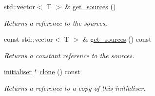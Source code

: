 \begin{DoxyCompactItemize}
std\+::vector$<$ T $>$ \& \hyperlink{classphysim_1_1init_1_1multisource_a075bc9637cb8b843253fade495de87c3}{get\+\_\+sources} ()
\begin{DoxyCompactList}\small\item\em Returns a reference to the sources. \end{DoxyCompactList}\item 
\mbox{\label{classphysim_1_1init_1_1multisource_a4e5a65dc115294367129be116d4aab83}} 
const std\+::vector$<$ T $>$ \& \hyperlink{classphysim_1_1init_1_1multisource_a4e5a65dc115294367129be116d4aab83}{get\+\_\+sources} () const
\begin{DoxyCompactList}\small\item\em Returns a constant reference to the sources. \end{DoxyCompactList}\item 
\mbox{\label{classphysim_1_1init_1_1multisource_affde6caf02eac0bb1b173ead8dd6f25c}} 
\hyperlink{classphysim_1_1init_1_1initialiser}{initialiser} $\ast$ \hyperlink{classphysim_1_1init_1_1multisource_affde6caf02eac0bb1b173ead8dd6f25c}{clone} () const
\begin{DoxyCompactList}\small\item\em Returns a reference to a copy of this initialiser. \end{DoxyCompactList}\end{DoxyCompactItemize}
